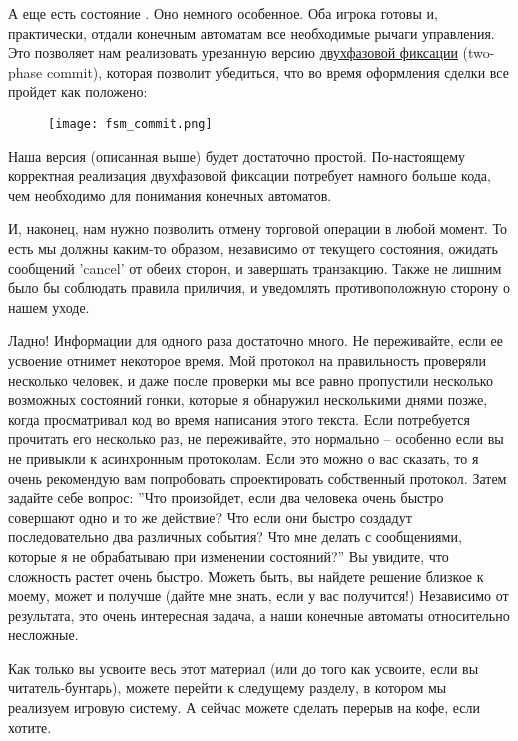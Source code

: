 А еще есть состояние .
Оно немного особенное.
Оба игрока готовы и, практически, отдали конечным автоматам все необходимые рычаги управления.
Это позволяет нам реализовать урезанную версию \href{http://en.wikipedia.org/wiki/Two-phase\_commit}{двухфазовой фиксации} (two-phase commit), которая позволит убедиться, что во время оформления сделки все пройдет как положено:

\begin{figure}[H]
    \centering
    \texttt{[image: fsm\_commit.png]}
\end{figure}

Наша версия (описанная выше) будет достаточно простой.
По\--настоящему корректная реализация двухфазовой фиксации потребует намного больше кода, чем необходимо для понимания конечных автоматов.

И, наконец, нам нужно позволить отмену торговой операции в любой момент.
То есть мы должны каким\--то образом, независимо от текущего состояния, ожидать сообщений 'cancel' от обеих сторон, и завершать транзакцию.
Также не лишним было бы соблюдать правила приличия, и уведомлять противоположную сторону о нашем уходе.

Ладно!
Информации для одного раза достаточно много.
Не переживайте, если ее усвоение отнимет некоторое время.
Мой протокол на правильность проверяли несколько человек, и даже после проверки мы все равно пропустили несколько возможных состояний гонки, которые я обнаружил несколькими днями позже, когда просматривал код во время написания этого текста.
Если потребуется прочитать его несколько раз, не переживайте, это нормально \--- особенно если вы не привыкли к асинхронным протоколам.
Если это можно о вас сказать, то я очень рекомендую вам попробовать спроектировать собственный протокол.
Затем задайте себе вопрос: ''Что произойдет, если два человека очень быстро совершают одно и то же действие?
Что если они быстро создадут последовательно два различных события?
Что мне делать с сообщениями, которые я не обрабатываю при изменении состояний?''
Вы увидите, что сложность растет очень быстро.
Можеть быть, вы найдете решение близкое к моему, может и получше (дайте мне знать, если у вас получится!)
Независимо от результата, это очень интересная задача, а наши конечные автоматы относительно несложные.

Как только вы усвоите весь этот материал (или до того как усвоите, если вы читатель\--бунтарь), можете перейти к следущему разделу, в котором мы реализуем игровую систему.
А сейчас можете сделать перерыв на кофе, если хотите.

